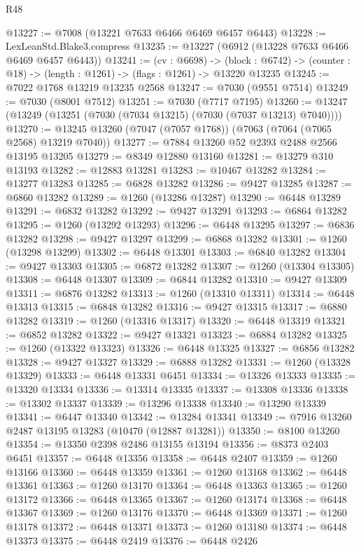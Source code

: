 \begin{lexlean}{R48}
\begin{coremodule}
@13227 := @7008 (@13221 @7633 @6466 @6469 @6457 @6443)
@13228 := LexLeanStd.Blake3.compress
@13235 := @13227 (@6912 (@13228 @7633 @6466 @6469 @6457 @6443))
@13241 := (cv : @6698) ->
  (block : @6742) -> (counter : @18) -> (length : @1261) -> (flags : @1261) -> @13220 @13235
@13245 := @7022 @1768 @13219 @13235 @2568
@13247 := @7030 (@9551 @7514)
@13249 := @7030 (@8001 @7512)
@13251 := @7030 (@7717 @7195)
@13260 := @13247 (@13249 (@13251 (@7030 (@7034 @13215) (@7030 (@7037 @13213) @7040))))
@13270 := @13245 @13260 (@7047 (@7057 @1768)) (@7063 (@7064 (@7065 @2568) @13219 @7040))
@13277 := @7884 @13260 @52 @2393 @2488 @2566 @13195 @13205
@13279 := @8349 @12880 @13160
@13281 := @13279 @310 @13193
@13282 := @12883 @13281
@13283 := @10467 @13282
@13284 := @13277 @13283
@13285 := @6828 @13282
@13286 := @9427 @13285
@13287 := @6860 @13282
@13289 := @1260 (@13286 @13287)
@13290 := @6448 @13289
@13291 := @6832 @13282
@13292 := @9427 @13291
@13293 := @6864 @13282
@13295 := @1260 (@13292 @13293)
@13296 := @6448 @13295
@13297 := @6836 @13282
@13298 := @9427 @13297
@13299 := @6868 @13282
@13301 := @1260 (@13298 @13299)
@13302 := @6448 @13301
@13303 := @6840 @13282
@13304 := @9427 @13303
@13305 := @6872 @13282
@13307 := @1260 (@13304 @13305)
@13308 := @6448 @13307
@13309 := @6844 @13282
@13310 := @9427 @13309
@13311 := @6876 @13282
@13313 := @1260 (@13310 @13311)
@13314 := @6448 @13313
@13315 := @6848 @13282
@13316 := @9427 @13315
@13317 := @6880 @13282
@13319 := @1260 (@13316 @13317)
@13320 := @6448 @13319
@13321 := @6852 @13282
@13322 := @9427 @13321
@13323 := @6884 @13282
@13325 := @1260 (@13322 @13323)
@13326 := @6448 @13325
@13327 := @6856 @13282
@13328 := @9427 @13327
@13329 := @6888 @13282
@13331 := @1260 (@13328 @13329)
@13333 := @6448 @13331 @6451
@13334 := @13326 @13333
@13335 := @13320 @13334
@13336 := @13314 @13335
@13337 := @13308 @13336
@13338 := @13302 @13337
@13339 := @13296 @13338
@13340 := @13290 @13339
@13341 := @6447 @13340
@13342 := @13284 @13341
@13349 := @7916 @13260 @2487 @13195 @13283 (@10470 (@12887 @13281))
@13350 := @8100 @13260
@13354 := @13350 @2398 @2486 @13155 @13194
@13356 := @8373 @2403 @6451
@13357 := @6448 @13356
@13358 := @6448 @2407
@13359 := @1260 @13166
@13360 := @6448 @13359
@13361 := @1260 @13168
@13362 := @6448 @13361
@13363 := @1260 @13170
@13364 := @6448 @13363
@13365 := @1260 @13172
@13366 := @6448 @13365
@13367 := @1260 @13174
@13368 := @6448 @13367
@13369 := @1260 @13176
@13370 := @6448 @13369
@13371 := @1260 @13178
@13372 := @6448 @13371
@13373 := @1260 @13180
@13374 := @6448 @13373
@13375 := @6448 @2419
@13376 := @6448 @2426

\end{coremodule}
\end{lexlean}
